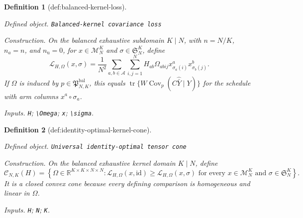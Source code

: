 \documentclass{article}
\newtheorem{definition}{Definition}
\begin{document}
\begin{definition}[def:balanced-kernel-loss]\label{def:balanced-kernel-loss}
\par\smallskip\noindent\emph{Defined object.} \texttt{Balanced-\allowbreak{}kernel covariance loss}
\par\smallskip\noindent\emph{Construction.} On the balanced exhaustive subdomain \(K\mid N\), with \(n=N/K\), \(n_a=n\), and \(n_{\mathrm u}=0\), for \(x\in\mathcal M_N^K\) and \(\sigma\in\mathfrak S_N^K\), define
\[
\mathscr L_{H,\Omega}(x,\sigma)=\frac{1}{N^2}\sum_{a,b\in\mathcal A}\sum_{i,j=1}^N H_{ab}\Omega_{abij}x^a_{\sigma_a(i)}x^b_{\sigma_b(j)}.
\]
If \(\Omega\) is induced by \(p\in\mathfrak P^{\mathrm{bal}}_{N,K}\), this equals \(\operatorname{tr}\{W\operatorname{Cov}_p(C\widehat{\bar Y}\mid Y)\}\) for the schedule with arm columns \(x^a\circ\sigma_a\).
\par\smallskip\noindent\emph{Inputs.} \texttt{H}; \texttt{\textbackslash{}\allowbreak{}Omega}; \texttt{x}; \texttt{\textbackslash{}\allowbreak{}sigma}.
\end{definition}

\begin{definition}[def:identity-optimal-kernel-cone]\label{def:identity-optimal-kernel-cone}
\par\smallskip\noindent\emph{Defined object.} \texttt{Universal identity-\allowbreak{}optimal tensor cone}
\par\smallskip\noindent\emph{Construction.} On the balanced exhaustive kernel domain \(K\mid N\), define
\[
\mathcal C_{N,K}(H)=\left\{\Omega\in\mathbb R^{K\times K\times N\times N}:\mathscr L_{H,\Omega}(x,\mathrm{id})\geq\mathscr L_{H,\Omega}(x,\sigma)\text{ for every }x\in\mathcal M_N^K\text{ and }\sigma\in\mathfrak S_N^K\right\}.
\]
It is a closed convex cone because every defining comparison is homogeneous and linear in \(\Omega\).
\par\smallskip\noindent\emph{Inputs.} \texttt{H}; \texttt{N}; \texttt{K}.
\end{definition}
\end{document}
